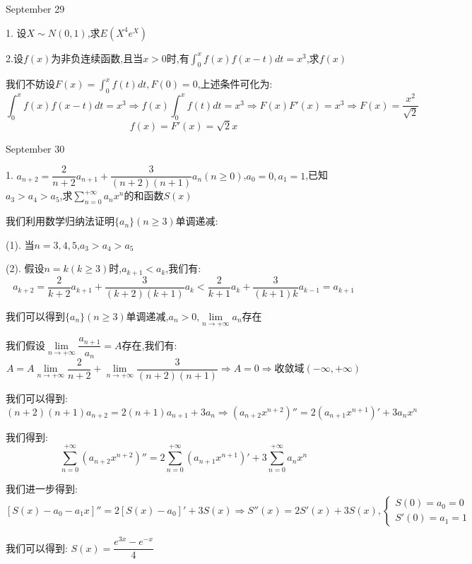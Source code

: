 \textcolor{purplea}{September 29}

1. 设$X\sim N(0,1)$,求$E(X^4e^{X})$
\begin{solution}
	
\end{solution}

2.设$f(x)$为非负连续函数,且当$x>0$时,有$\int_{0}^{x}f(x)f(x-t)dt=x^3$,求$f(x)$ 
\begin{solution}

	我们不妨设$F(x)=\int_{0}^{x}f(t)dt,F(0)=0$,上述条件可化为:  
	$$\int_{0}^{x}f(x)f(x-t)dt=x^3\Rightarrow f(x)\int_{0}^{x}f(t)dt=x^3\Rightarrow F(x)F'(x)=x^3\Rightarrow F(x)=\dfrac{x^2}{\sqrt{2}}$$
	$$f(x)=F'(x)=\sqrt{2}x$$
\end{solution}

\textcolor{purplea}{September 30}

1. $a_{n+2}=\dfrac{2}{n+2}a_{n+1}+\dfrac{3}{(n+2)(n+1)}a_{n}(n\geq 0)$,$a_{0}=0,a_{1}=1$,已知$a_{3}>a_{4}>a_{5}$,求$\sum\limits_{n=0}^{+\infty}a_{n}x^n$的和函数$S(x)$
\begin{solution}

	我们利用数学归纳法证明$\{a_{n}\}(n\geq 3)$单调递减:  
	
	(1). 当$n=3,4,5$,$a_{3}>a_{4}>a_{5}$
	
	(2). 假设$n=k(k\geq 3)$时,$a_{k+1}<a_{k}$,我们有:  
	$$a_{k+2}=\dfrac{2}{k+2}a_{k+1}+\dfrac{3}{(k+2)(k+1)}a_{k}<\dfrac{2}{k+1}a_{k}+\dfrac{3}{(k+1)k}a_{k-1}=a_{k+1}$$
	
	我们可以得到$\{a_{n}\}(n\geq 3)$单调递减,$a_{n}>0$,$\lim\limits_{n\to+\infty}a_{n}$存在
	
	我们假设$\lim\limits_{n\to+\infty}\dfrac{a_{n+1}}{a_{n}}=A$存在,我们有:  
	$$A=A\lim\limits_{n\to+\infty}\dfrac{2}{n+2}+\lim\limits_{n\to+\infty}\dfrac{3}{(n+2)(n+1)}\Rightarrow A=0\Rightarrow \text{收敛域}(-\infty,+\infty)$$
	
	我们可以得到:  
	$$(n+2)(n+1)a_{n+2}=2(n+1)a_{n+1}+3a_{n}\Rightarrow (a_{n+2}x^{n+2})''=2(a_{n+1}x^{n+1})'+3a_{n}x^n$$
	
	我们得到:  $$\sum\limits_{n=0}^{+\infty}(a_{n+2}x^{n+2})''=2\sum\limits_{n=0}^{+\infty}(a_{n+1}x^{n+1})'+3\sum\limits_{n=0}^{+\infty}a_{n}x^n$$
	
	我们进一步得到:  
	$$[S(x)-a_{0}-a_{1}x]''=2[S(x)-a_{0}]'+3S(x)\Rightarrow S''(x)=2S'(x)+3S(x),\left\lbrace
	\begin{array}{l}
		S(0)=a_{0}=0\\
		S'(0)=a_{1}=1
	\end{array}
	\right. $$
	
	我们可以得到:  $S(x)=\dfrac{e^{3x}-e^{-x}}{4}$
\end{solution}

